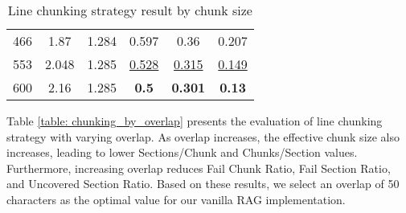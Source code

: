 \begin{table}[H]
{\begin{tabular}{@{}lccccc@{}}
466        & 1.87                              & 1.284                             & 0.597                                & 0.36                                   & 0.207                                       \\

553        & 2.048                             & 1.285                             & \underline{0.528}                          & \underline{0.315}                            & \underline{0.149}                                 \\

600        & 2.16                              & 1.285                             & \textbf{0.5}                         & \textbf{0.301}                         & \textbf{0.13}                               \\ \bottomrule
\end{tabular}
}
\caption{Line chunking strategy result by chunk size}
\label{table: chunking_by_size}
\end{table}


Table \ref{table: chunking_by_overlap} presents the evaluation of line chunking strategy with varying overlap. As overlap increases, the effective chunk size also increases, leading to lower Sections/Chunk and Chunks/Section values. Furthermore, increasing overlap reduces Fail Chunk Ratio, Fail Section Ratio, and Uncovered Section Ratio. Based on these results, we select an overlap of 50 characters as the optimal value for our vanilla RAG implementation.

